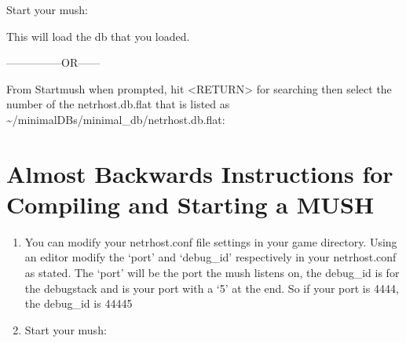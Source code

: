 \documentclass[letterpaper,10pt,english]{sphinxmanual}
\begin{document}
\begin{enumerate}
\sphinxAtStartPar
Start your mush:

\begin{sphinxVerbatim}[commandchars=\\\{\}]
\end{sphinxVerbatim}

\sphinxAtStartPar
This will load the db that you loaded.

\sphinxAtStartPar
—————OR——\sphinxhyphen{}

\sphinxAtStartPar
From Startmush when prompted, hit \textless{}RETURN\textgreater{} for searching then select the number of the netrhost.db.flat that is listed as \textasciitilde{}/minimal\sphinxhyphen{}DBs/minimal\_db/netrhost.db.flat:

\begin{sphinxVerbatim}[commandchars=\\\{\}]
\end{sphinxVerbatim}

\end{enumerate}


\section{Almost Backwards Instructions for Compiling and Starting a MUSH}
\label{\detokenize{install:almost-backwards-instructions-for-compiling-and-starting-a-mush}}\begin{enumerate}
%
\item {} 
\sphinxAtStartPar
You can modify your netrhost.conf file settings in your game directory.
Using an editor modify the ‘port’ and ‘debug\_id’ respectively in your netrhost.conf as stated.
The ‘port’ will be the port the mush listens on, the debug\_id is for the debug\sphinxhyphen{}stack and is
your port with a ‘5’ at the end.  So if your port is 4444, the debug\_id is 44445

\item {} 
\sphinxAtStartPar
Start your mush:

\begin{sphinxVerbatim}[commandchars=\\\{\}]
 
\end{sphinxVerbatim}

\end{enumerate}
\end{document}
